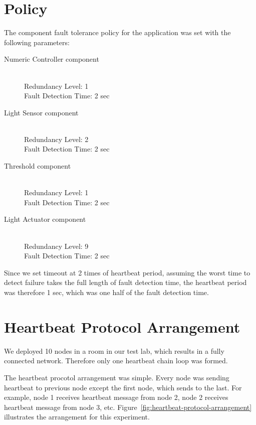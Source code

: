 \section{Policy}

The component fault tolerance policy for the application was set with the
following parameters:

\begin{description}
  \item[Numeric Controller component] \hfill \\
    Redundancy Level: 1\\
    Fault Detection Time: 2 sec\\
  \item[Light Sensor component] \hfill \\
    Redundancy Level: 2\\
    Fault Detection Time: 2 sec\\
  \item[Threshold component] \hfill \\
    Redundancy Level: 1\\
    Fault Detection Time: 2 sec\\
  \item[Light Actuator component] \hfill \\
    Redundancy Level: 9\\
    Fault Detection Time: 2 sec\\
\end{description}

Since we set timeout at 2 times of heartbeat period, assuming the worst time to detect
failure takes the full length of fault detection time, the heartbeat
period was therefore 1 sec, which was one half of the fault detection time.

\section{Heartbeat Protocol Arrangement}

We deployed 10 nodes in a room in our test lab, which results in a fully
connected network. Therefore only one heartbeat chain loop was formed.

The heartbeat procotol arrangement was simple. Every node was sending heartbeat to
previous node except the first node, which sends to the last. For example, node
1 receives heartbeat message from node 2, node 2 receives heartbeat message from
node 3, etc. Figure~\ref{fig:heartbeat-protocol-arrangement} illustrates the
arrangement for this experiment.

